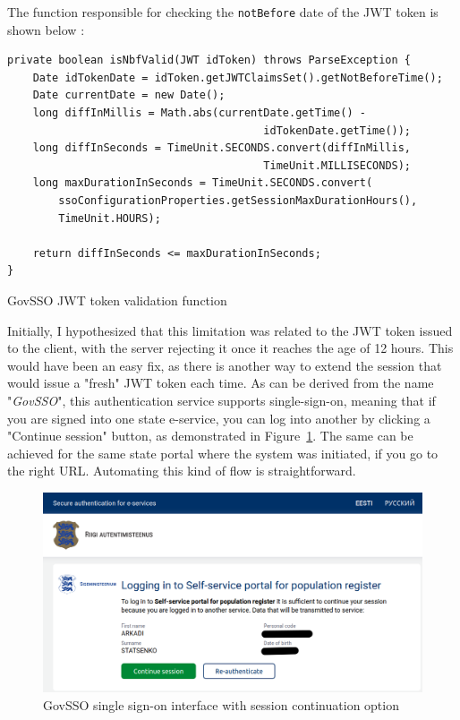 The function responsible for checking the \texttt{notBefore} date of the JWT token is shown below \cite{govsso-session-hydra}:

\begin{listing}[H]
\begin{verbatim}
private boolean isNbfValid(JWT idToken) throws ParseException {
    Date idTokenDate = idToken.getJWTClaimsSet().getNotBeforeTime();
    Date currentDate = new Date();
    long diffInMillis = Math.abs(currentDate.getTime() -
                                        idTokenDate.getTime());
    long diffInSeconds = TimeUnit.SECONDS.convert(diffInMillis, 
                                        TimeUnit.MILLISECONDS);
    long maxDurationInSeconds = TimeUnit.SECONDS.convert(
        ssoConfigurationProperties.getSessionMaxDurationHours(), 
        TimeUnit.HOURS);

    return diffInSeconds <= maxDurationInSeconds;
}
\end{verbatim}
\caption{GovSSO JWT token validation function}
\label{lst:govsso-jwt-validation}
\end{listing}

Initially, I hypothesized that this limitation was related to the JWT token issued to the client, with the server rejecting it once it reaches the age of 12 hours. This would have been an easy fix, as there is another way to extend the session that would issue a "fresh" JWT token each time. As can be derived from the name "\textit{GovSSO}", this authentication service supports single-sign-on, meaning that if you are signed into one state e-service, you can log into another by clicking a "Continue session" button, as demonstrated in Figure~\ref{fig:eesti-ee-continue-session}. The same can be achieved for the same state portal where the system was initiated, if you go to the right URL. Automating this kind of flow is straightforward.

\begin{figure}[H]
\centering
\includegraphics[width=450px]{english/figures/Screenshot from 2025-08-08 20-37-42.png}
\caption{GovSSO single sign-on interface with session continuation option\cite{eesti-ee-screenshot}}
\label{fig:eesti-ee-continue-session}
\end{figure}

